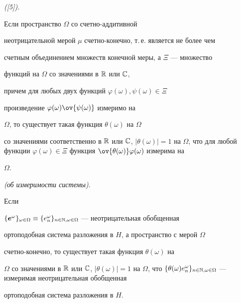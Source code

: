 \begin{lem} {\em ([5])}.


Если пространство $\Omega$ со счетно-аддитивной


неотрицательной мерой $\mu$ счетно-конечно, т.\,е. является не более чем


счетным объединением множеств конечной меры, а $\Xi$ --- множество


функций на $\Omega$ со значениями в $\Bbb R$ или $\Bbb C$,


причем для любых двух функций $\varphi(\omega),\psi(\omega)\in\Xi$


произведение $\varphi(\omega)\ov {\psi(\omega)}$ измеримо на


$\Omega$, то существует такая функция $\theta(\omega)$ на $\Omega$


со значениями соответственно в $\Bbb R$ или $\Bbb C$, $|\theta


(\omega)|=1$ на $\Omega$, что для любой функции $\varphi(\omega)\in


\Xi$ функция $\ov {\theta(\omega)}\varphi(\omega)$ измерима на


$\Omega$.


\end{lem}





\begin{thm} {\em (об измеримости системы)}.


Если


$\{\boldsymbol e^\omega\}_{\omega\in\Omega}\equiv\{e^\omega_n\}_{n\in


\Bbb N, \omega\in\Omega}$ --- неотрицательная обобщенная


ортоподобная система разложения в $H$, а пространство с мерой $\Omega$


счетно-конечно, то существует такая функция $\theta(\omega)$ на


$\Omega$ со значениями в $\Bbb R$ или $\Bbb C$, $|\theta(\omega


)|=1$ на $\Omega$, что $\{\theta(\omega)e^\omega_n\}_{n\in\Bbb


N,\omega\in\Omega}$ --- измеримая неотрицательная обобщенная


ортоподобная система разложения в $H$.


\end{thm}





